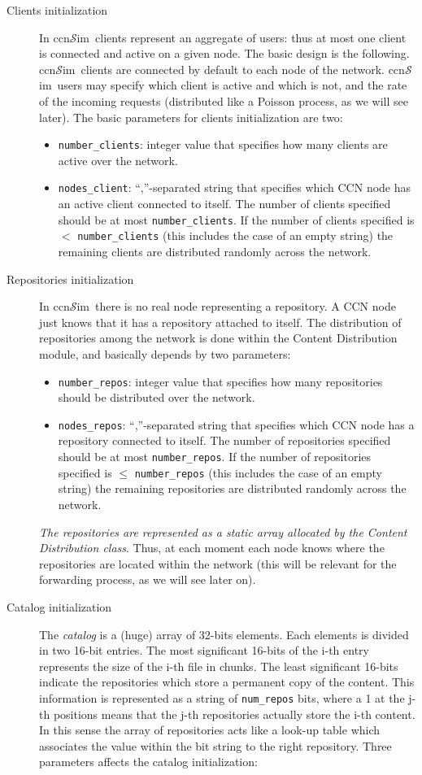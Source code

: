 \documentclass{article}
\newcommand{\ccnsim}{ccn$\mathcal{S}$im}
\begin{document}
\begin{description}
    \item[Clients initialization] In \ccnsim\ clients represent an aggregate of users: thus at most one client is connected and active on a given node. The basic design is the following. \ccnsim\ clients are connected by default to each node of the network. \ccnsim\ users may specify which client is active and which is not, and the rate of the incoming requests (distributed like a Poisson process, as we will see later). The basic parameters for clients initialization are two:
	\begin{itemize}
	    \item \verb|number_clients|: integer value that specifies how many clients are active over the network. 
	    \item \verb|nodes_client|: ``,''-separated string that specifies which CCN node has an active client connected to itself.  The number of clients specified should be at most \verb|number_clients|. If the number of clients specified is $<$ \verb|number_clients| (this includes the case of an empty string) the remaining clients are distributed randomly across the network. 
	\end{itemize}
    \item[Repositories initialization]  In \ccnsim\ there is no real node representing a repository. A CCN node just  knows that it has a repository attached to itself. The distribution of repositories among the network is done within the Content Distribution module, and basically depends by two parameters:
	\begin{itemize}
	    \item \verb|number_repos|: integer value that specifies how many repositories should be distributed over the network.
	    \item \verb|nodes_repos|: ``,''-separated string that specifies which CCN node has a repository connected to itself.  The number of repositories specified should be at most \verb|number_repos|. If the number of repositories specified is $\leq$ \verb|number_repos| (this includes the case of an empty string) the remaining repositories are distributed randomly across the network. 
	\end{itemize}
	\emph{The repositories are represented as a static array allocated by the Content Distribution class}. Thus, at each moment each node knows where the repositories are located within the network (this will be relevant for the forwarding process, as we will see later on).
    \item[Catalog initialization] The \emph{catalog} is a (huge) array of 32-bits elements. Each elements is divided in two 16-bit entries. The most significant 16-bits of the i-th entry represents the size of the i-th file in chunks. The least significant 16-bits indicate the repositories which store a permanent copy of the content. This information is represented as  a string of \verb|num_repos| bits, where a 1 at the j-th positions means that the j-th repositories actually store the i-th content. In this sense the array of repositories acts like a look-up table which associates the value within the bit string to the right repository. Three parameters affects the catalog initialization:

\end{description}
\end{document}
